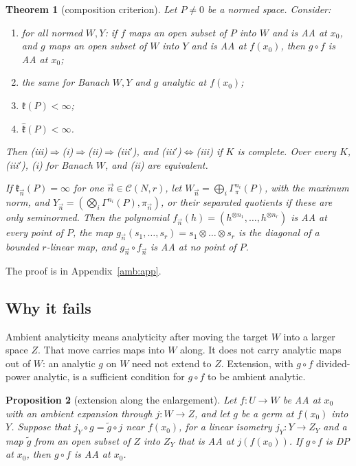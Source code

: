\documentclass[11pt]{amsart}
\newtheorem{theorem}{Theorem}[section]
\newtheorem{proposition}[theorem]{Proposition}
\theoremstyle{definition}
\theoremstyle{remark}
\numberwithin{equation}{section}
\theoremstyle{plain}
\theoremstyle{definition}
\theoremstyle{plain}
\begin{document}
\begin{theorem}[composition criterion]\label{amb:thm:composition}
Let $P\ne0$ be a normed space. Consider:
\begin{enumerate}
\item[\textup{(i)}] for all normed $W,Y$: if $f$ maps an open subset of $P$ into $W$ and is AA at $x_0$, and $g$ maps an open subset of $W$ into $Y$ and is AA at $f(x_0)$, then $g\circ f$ is AA at $x_0$;
\item[\textup{(ii)}] the same for Banach $W,Y$ and $g$ analytic at $f(x_0)$;
\item[\textup{(iii)}] $\mathfrak k(P)<\infty$;
\item[\textup{(iii$'$)}] $\widehat{\mathfrak k}(P)<\infty$.
\end{enumerate}
Then \textup{(iii)}$\Rightarrow$\textup{(i)}$\Rightarrow$\textup{(ii)}$\Rightarrow$\textup{(iii$'$)}, and \textup{(iii$'$)}$\Leftrightarrow$\textup{(iii)} if $K$ is complete. Over every $K$, \textup{(iii$'$)}, \textup{(i)} for Banach $W$, and \textup{(ii)} are equivalent.

If $\mathfrak k_{\vec n}(P)=\infty$ for one $\vec n\in\mathcal C(N,r)$, let $W_{\vec n}=\bigoplus_i\Gamma^{n_i}_\pi(P)$, with the maximum norm, and $Y_{\vec n}=(\bigotimes_i\Gamma^{n_i}(P),\pi_{\vec n})$, or their separated quotients if these are only seminormed. Then the polynomial $f_{\vec n}(h)=(h^{\otimes n_1},\dots,h^{\otimes n_r})$ is AA at every point of $P$, the map $g_{\vec n}(s_1,\dots,s_r)=s_1\otimes\dots\otimes s_r$ is the diagonal of a bounded $r$-linear map, and $g_{\vec n}\circ f_{\vec n}$ is AA at no point of $P$.
\end{theorem}
The proof is in Appendix~\ref{amb:app}.

\subsection{Why it fails}\label{amb:ssec:mechanism}

Ambient analyticity means analyticity after moving the target $W$ into a larger space $Z$. That move carries maps into $W$ along. It does not carry analytic maps out of $W$: an analytic $g$ on $W$ need not extend to $Z$. Extension, with $g\circ f$ divided-power analytic, is a sufficient condition for $g\circ f$ to be ambient analytic.

\begin{proposition}[extension along the enlargement]\label{amb:prop:extension}
Let $f\colon U\to W$ be AA at $x_0$ with an ambient expansion through $j\colon W\to Z$, and let $g$ be a germ at $f(x_0)$ into $Y$. Suppose that $j_Y\circ g=\tilde g\circ j$ near $f(x_0)$, for a linear isometry $j_Y\colon Y\to Z_Y$ and a map $\tilde g$ from an open subset of $Z$ into $Z_Y$ that is AA at $j(f(x_0))$. If $g\circ f$ is DP at $x_0$, then $g\circ f$ is AA at $x_0$.
\end{proposition}
\end{document}
